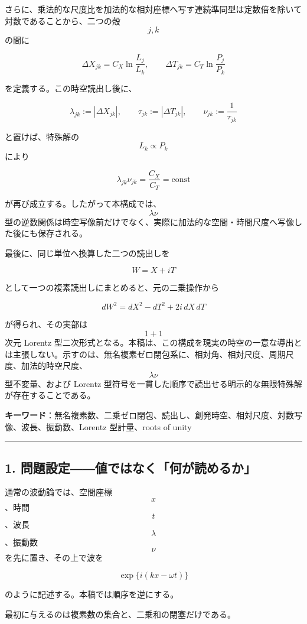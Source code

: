 \documentclass[
  a4paper,
]{ltjsarticle}
\begin{document}
さらに、乗法的な尺度比を加法的な相対座標へ写す連続準同型は定数倍を除いて対数であることから、二つの殻
\[j,k\] の間に

\[
\Delta X_{jk}=C_X\ln\frac{L_j}{L_k},
\qquad
\Delta T_{jk}=C_T\ln\frac{P_j}{P_k}
\]

を定義する。この時空読出し後に、

\[
\lambda_{jk}:=|\Delta X_{jk}|,
\qquad
\tau_{jk}:=|\Delta T_{jk}|,
\qquad
\nu_{jk}:=\frac{1}{\tau_{jk}}
\]

と置けば、特殊解の \[L_k\propto P_k\] により

\[
\lambda_{jk}\nu_{jk}
=
\frac{C_X}{C_T}
=
\mathrm{const}
\]

が再び成立する。したがって本構成では、\[\lambda\nu\]
型の逆数関係は時空写像前だけでなく、実際に加法的な空間・時間尺度へ写像した後にも保存される。

最後に、同じ単位へ換算した二つの読出しを

\[
W=X+iT
\]

として一つの複素読出しにまとめると、元の二乗操作から

\[
dW^2=dX^2-dT^2+2i\,dX\,dT
\]

が得られ、その実部は \[1+1\] 次元 Lorentz
型二次形式となる。本稿は、この構成を現実の時空の一意な導出とは主張しない。示すのは、無名複素ゼロ閉包系に、相対角、相対尺度、周期尺度、加法的時空尺度、\[\lambda\nu\]
型不変量、および Lorentz
型符号を一貫した順序で読出せる明示的な無限特殊解が存在することである。

\textbf{キーワード}：無名複素数、二乗ゼロ閉包、読出し、創発時空、相対尺度、対数写像、波長、振動数、Lorentz
型計量、roots of unity

\begin{center}\rule{0.5\linewidth}{0.5pt}\end{center}

\subsection{1.
問題設定――値ではなく「何が読めるか」}\label{ux554fux984cux8a2dux5b9aux5024ux3067ux306fux306aux304fux4f55ux304cux8aadux3081ux308bux304b}

通常の波動論では、空間座標 \[x\]、時間 \[t\]、波長 \[\lambda\]、振動数
\[\nu\] を先に置き、その上で波を

\[
\exp\{i(kx-\omega t)\}
\]

のように記述する。本稿では順序を逆にする。

最初に与えるのは複素数の集合と、二乗和の閉塞だけである。
\end{document}
